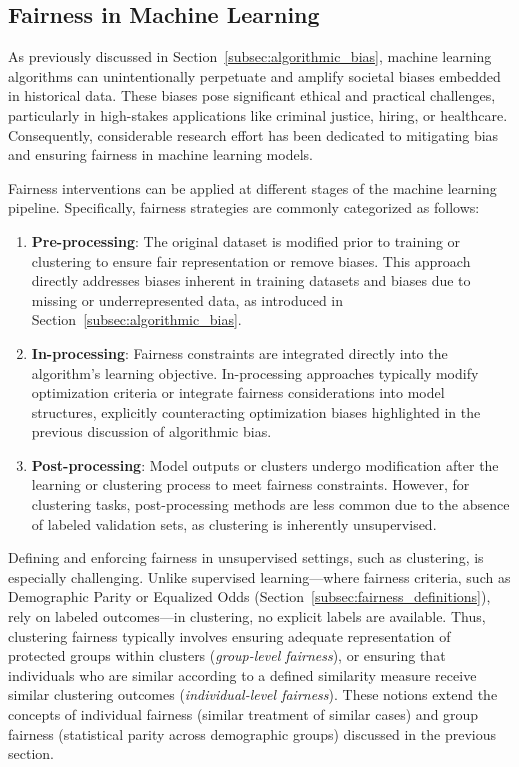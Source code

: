 \subsection{Fairness in Machine Learning}
As previously discussed in Section~\ref{subsec:algorithmic_bias}, machine learning algorithms can unintentionally perpetuate and amplify societal biases embedded in historical data. These biases pose significant ethical and practical challenges, particularly in high-stakes applications like criminal justice, hiring, or healthcare. Consequently, considerable research effort has been dedicated to mitigating bias and ensuring fairness in machine learning models.

Fairness interventions can be applied at different stages of the machine learning pipeline. Specifically, fairness strategies are commonly categorized as follows:

\begin{enumerate}
    \item \textbf{Pre-processing}: The original dataset is modified prior to training or clustering to ensure fair representation or remove biases. This approach directly addresses biases inherent in training datasets and biases due to missing or underrepresented data, as introduced in Section~\ref{subsec:algorithmic_bias}.
    
    \item \textbf{In-processing}: Fairness constraints are integrated directly into the algorithm's learning objective. In-processing approaches typically modify optimization criteria or integrate fairness considerations into model structures, explicitly counteracting optimization biases highlighted in the previous discussion of algorithmic bias.
    
    \item \textbf{Post-processing}: Model outputs or clusters undergo modification after the learning or clustering process to meet fairness constraints. However, for clustering tasks, post-processing methods are less common due to the absence of labeled validation sets, as clustering is inherently unsupervised.
\end{enumerate}

Defining and enforcing fairness in unsupervised settings, such as clustering, is especially challenging. Unlike supervised learning—where fairness criteria, such as Demographic Parity or Equalized Odds (Section~\ref{subsec:fairness_definitions}), rely on labeled outcomes—in clustering, no explicit labels are available. Thus, clustering fairness typically involves ensuring adequate representation of protected groups within clusters (\textit{group-level fairness}), or ensuring that individuals who are similar according to a defined similarity measure receive similar clustering outcomes (\textit{individual-level fairness}). These notions extend the concepts of individual fairness (similar treatment of similar cases) and group fairness (statistical parity across demographic groups) discussed in the previous section.

